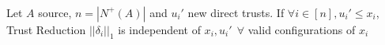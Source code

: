 \begin{theorem} \ \\
   \label{invariability}
   Let $A$ source, $n = |N^{+}(A)|$ and $u_i'$ new direct trusts. If $\forall i \in [n],u_i' \leq x_i$,
   Trust Reduction $||\delta_i||_1$ is independent of $x_i, u_i' \:\: \forall$ valid configurations of $x_i$
\end{theorem}

